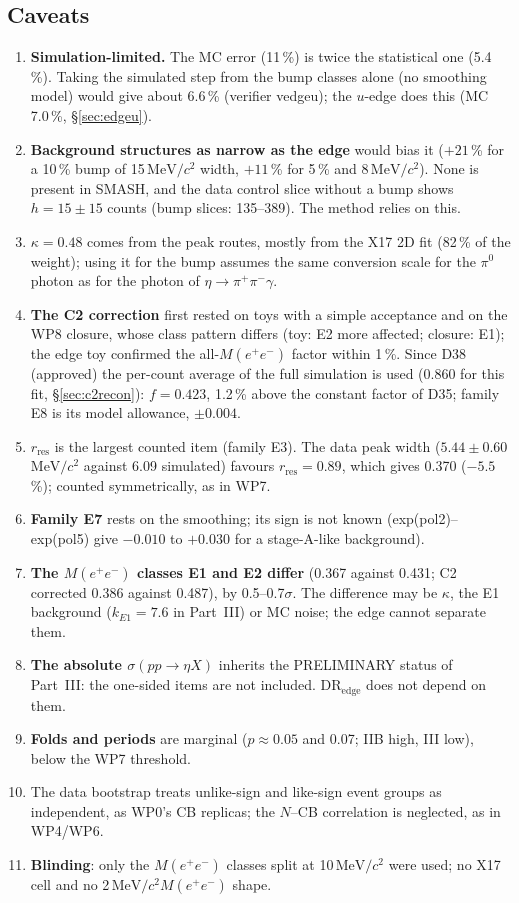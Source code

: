 \documentclass[11pt,a4paper]{article}
\newcommand{\piz}{\ensuremath{\pi^{0}}\xspace}
\newcommand{\pipi}{\ensuremath{\pi^{+}\pi^{-}}\xspace}
\newcommand{\Mee}{\ensuremath{M(e^{+}e^{-})}\xspace}
\newcommand{\MeVcc}{\ensuremath{\mathrm{MeV}/c^{2}}\xspace}
\newcommand{\kEone}{\ensuremath{k_{E1}}\xspace}
\newcommand{\sigeta}{\ensuremath{\sigma(pp\to\eta X)}\xspace}
\begin{document}
\subsection{Caveats}
\label{sec:bedge-cav}
\begin{enumerate}\setlength{\itemsep}{1pt}
\item \textbf{Simulation-limited.} The MC error (11\,\%) is twice the statistical one (5.4\,\%). Taking the simulated step from the bump classes
      alone (no smoothing model) would give about 6.6\,\% (verifier vedgeu); the $u$-edge does this (MC 7.0\,\%, \S\ref{sec:edgeu}).
\item \textbf{Background structures as narrow as the edge} would bias it ($+21$\,\% for a 10\,\% bump of 15\,\MeVcc width, $+11$\,\% for 5\,\% and
      8\,\MeVcc). None is present in SMASH, and the data control slice without a bump shows $h=15\pm15$ counts (bump slices: 135--389). The method relies on this.
\item \textbf{$\kappa=0.48$} comes from the peak routes, mostly from the X17 2D fit (82\,\% of the weight); using it for the bump assumes the same
      conversion scale for the \piz photon as for the photon of $\eta\to\pipi\gamma$.
\item \textbf{The C2 correction} first rested on toys with a simple acceptance and on the WP8 closure, whose class pattern differs (toy: E2
      more affected; closure: E1); the edge toy confirmed the all-\Mee factor within 1\,\%. Since D38 (approved) the per-count average of the full
      simulation is used (0.860 for this fit, \S\ref{sec:c2recon}): $f=0.423$, 1.2\,\% above the constant factor of D35; family E8 is its model
      allowance, $\pm0.004$.
\item \textbf{$r_{\mathrm{res}}$} is the largest counted item (family E3). The data peak width ($5.44\pm0.60$\,\MeVcc against 6.09 simulated) favours
      $r_{\mathrm{res}}=0.89$, which gives 0.370 ($-5.5$\,\%); counted symmetrically, as in WP7.
\item \textbf{Family E7} rests on the smoothing; its sign is not known (exp(pol2)--exp(pol5) give $-0.010$ to $+0.030$ for a stage-A-like background).
\item \textbf{The \Mee classes E1 and E2 differ} (0.367 against 0.431; C2 corrected 0.386 against 0.487), by 0.5--0.7$\sigma$. The difference may be $\kappa$, the E1
      background ($\kEone=7.6$ in Part~III) or MC noise; the edge cannot separate them.
\item \textbf{The absolute \sigeta} inherits the PRELIMINARY status of Part~III: the one-sided items are not included. $\mathrm{DR}_{\mathrm{edge}}$
      does not depend on them.
\item \textbf{Folds and periods} are marginal ($p\approx0.05$ and 0.07; IIB high, III low), below the WP7 threshold.
\item The data bootstrap treats unlike-sign and like-sign event groups as independent, as WP0's CB replicas; the $N$--CB correlation is
      neglected, as in WP4/WP6.
\item \textbf{Blinding}: only the \Mee classes split at 10\,\MeVcc were used; no X17 cell and no 2\,\MeVcc \Mee shape.
\end{enumerate}
\end{document}
